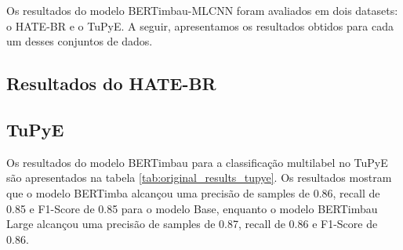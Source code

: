 \documentclass[sigconf,nonacm]{acmart}
\begin{document}
Os resultados do modelo BERTimbau-MLCNN foram avaliados em dois datasets: o HATE-BR e o TuPyE. A seguir, apresentamos os resultados obtidos para cada um desses conjuntos de dados.
\subsection{Resultados do HATE-BR}

\subsection{TuPyE}

Os resultados do modelo BERTimbau para a classificação multilabel no TuPyE são apresentados na tabela \ref{tab:original_results_tupye}. Os resultados mostram que o modelo BERTimba alcançou uma precisão de samples de 0.86, recall de 0.85 e F1-Score de 0.85 para o modelo Base, enquanto o modelo BERTimbau Large alcançou uma precisão de samples de 0.87, recall de 0.86 e F1-Score de 0.86.
\end{document}

